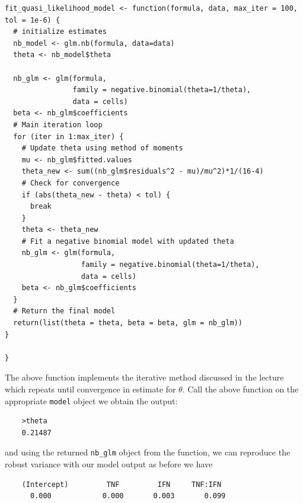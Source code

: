 \documentclass{article}
\begin{document}
\begin{verbatim}
fit_quasi_likelihood_model <- function(formula, data, max_iter = 100, tol = 1e-6) {
  # initialize estimates
  nb_model <- glm.nb(formula, data=data)
  theta <- nb_model$theta
  
  nb_glm <- glm(formula,
                family = negative.binomial(theta=1/theta),
                data = cells)
  beta <- nb_glm$coefficients
  # Main iteration loop
  for (iter in 1:max_iter) {
    # Update theta using method of moments
    mu <- nb_glm$fitted.values
    theta_new <- sum((nb_glm$residuals^2 - mu)/mu^2)*1/(16-4)
    # Check for convergence
    if (abs(theta_new - theta) < tol) {
      break
    }
    theta <- theta_new
    # Fit a negative binomial model with updated theta
    nb_glm <- glm(formula,
                  family = negative.binomial(theta=1/theta),
                  data = cells)
    beta <- nb_glm$coefficients
  }
  # Return the final model
  return(list(theta = theta, beta = beta, glm = nb_glm))
}

}
\end{verbatim}
The above function implements the iterative method discussed in the lecture which repeats until convergence in estimate for $\theta$. Call the above function on the appropriate \texttt{model} object we obtain the output:

\begin{verbatim}
    >theta
    0.21487
\end{verbatim}
and using the returned \texttt{nb\_glm} object from the function, we can reproduce the robust variance with our model output as before we have
\begin{verbatim}
    (Intercept)         TNF         IFN     TNF:IFN 
      0.000            0.000       0.003       0.099 
\end{verbatim}
\end{document}

